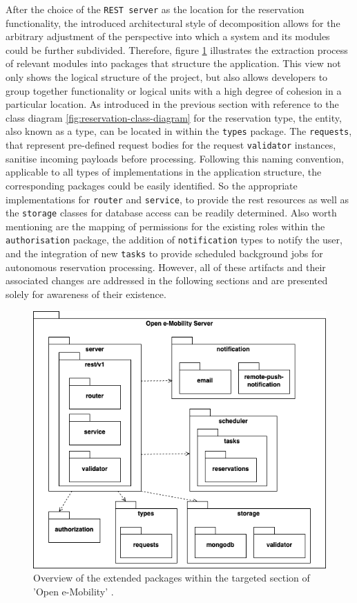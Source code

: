 After the choice of the \texttt{REST server} as the location for the reservation functionality, the introduced architectural style of decomposition allows for the arbitrary adjustment of the perspective into which a system and its modules could be further subdivided.
Therefore, figure \ref{fig:package-view} illustrates the extraction process of relevant modules into packages that structure the application. This view not only shows the logical structure of the project, but also allows developers to group together functionality or logical units with a high degree of cohesion in a particular location.
As introduced in the previous section with reference to the class diagram \ref{fig:reservation-class-diagram} for the reservation type, the entity, also known as a type, can be located in within the \texttt{types} package. 
The \texttt{requests}, that represent pre-defined request bodies for the request \texttt{validator} instances, sanitise incoming payloads before processing. Following this naming convention, applicable to all types of implementations in the application structure, the corresponding packages could be easily identified.
So the appropriate implementations for \texttt{router} and \texttt{service}, to provide the \acrshort{rest} resources as well as the \texttt{storage} classes for database access can be readily determined. 
Also worth mentioning are the mapping of permissions for the existing roles within the \texttt{authorisation} package, the addition of \texttt{notification} types to notify the user, and the integration of new \texttt{tasks} to provide scheduled background jobs for autonomous reservation processing.
However, all of these artifacts and their associated changes are addressed in the following sections and are presented solely for awareness of their existence.

\begin{figure}[h]
    \centering
    \includegraphics[scale=0.4]{resources/images/main/6_implementation/PackageDiagram.png}
    \caption{Overview of the extended packages within the targeted section of 'Open e-Mobility' \cite{noauthor_open_2023}.}
    \label{fig:package-view}
\end{figure}

